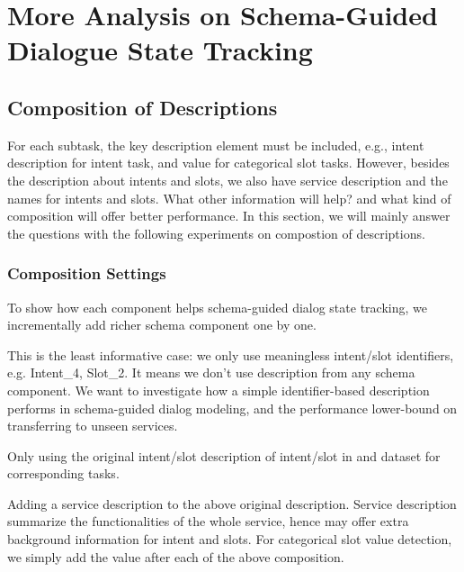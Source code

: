 \chapter{More Analysis on Schema-Guided Dialogue State Tracking}
\label{chap:appendix:schema}
\section{Composition of Descriptions}
\label{sec:sgd:com-desc}
For each subtask, the key description element must be included, e.g.,
intent description for intent task, and value for categorical slot
tasks. However, besides the description about intents and slots, we
also have service description and the names for intents and
slots. What other information will help? and what kind of composition
will offer better performance. In this section, we will mainly answer
the questions with the following experiments on compostion of
descriptions.

\subsection{Composition Settings}
\label{ssec:sgd:com-settings}
 To show how each component helps schema-guided dialog state
tracking, we incrementally add richer schema component one by one.

 This is the least informative case: we only use
  meaningless intent/slot identifiers, e.g. Intent\_4, Slot\_2. It means we don't use
  description from any schema component. We want to investigate how a
  simple identifier-based description performs in schema-guided dialog
  modeling, and the performance lower-bound on transferring to unseen services.

 Only using the original intent/slot description
  of intent/slot in \sgdst and \multiwoz dataset for corresponding
  tasks.

 Adding a service description to the above
  original description. Service description summarize the
  functionalities of the whole service, hence may offer extra background
  information for intent and slots.
For categorical slot value detection, we simply add the
value after each of the above composition.

